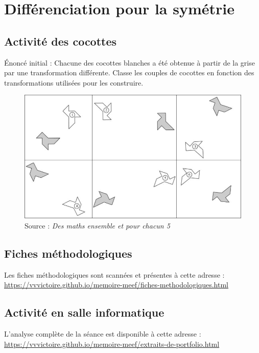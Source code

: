 \section{Différenciation pour la symétrie}

\subsection{Activité des cocottes}\label{annexe:symetrie-act}

Énoncé initial : Chacune des cocottes blanches a été obtenue à partir de la grise par une transformation différente.  Classe les couples de cocottes en fonction des transformations utilisées pour les construire. 

\begin{figure}[h!]
    \centering
    \includegraphics[width=0.9\linewidth]{img/activitemepcc.jpg}
    \caption{Source : \textit{Des maths ensemble et pour chacun 5}}
    \label{fig:angles-fiche1}
\end{figure}

\subsection{Fiches méthodologiques}\label{annexe:symetrie-fiches}

Les fiches méthodologiques sont scannées et présentes à cette adresse : \url{https://vvvictoire.github.io/memoire-meef/fiches-methodologiques.html}

\subsection{Activité en salle informatique}\label{annexe:symetrie-tice}

L'analyse complète de la séance est disponible à cette adresse : \url{https://vvvictoire.github.io/memoire-meef/extraits-de-portfolio.html}

